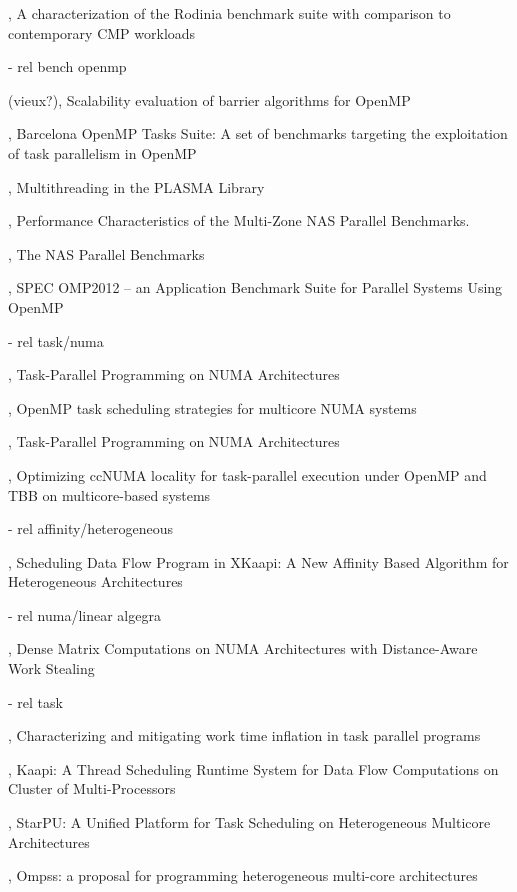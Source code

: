 \cite{Rodinia2010}, A characterization of the Rodinia benchmark suite with comparison to contemporary CMP workloads

  - rel bench openmp

(vieux?)\cite{Nanjegowda2009}, Scalability evaluation of barrier algorithms for OpenMP

\cite{Duran2009}, Barcelona OpenMP Tasks Suite: A set of benchmarks targeting the exploitation of task parallelism in OpenMP

\cite{Kurzak2013}, Multithreading in the PLASMA Library

\cite{Jin2004}, Performance Characteristics of the Multi-Zone NAS Parallel Benchmarks.

\cite{Bailey1994}, The NAS Parallel Benchmarks

\cite{Muller2012}, SPEC OMP2012 -- an Application Benchmark Suite for Parallel Systems Using OpenMP

  - rel task/numa

\cite{Wienke2012}, Task-Parallel Programming on NUMA Architectures

\cite{Olivier2012}, OpenMP task scheduling strategies for multicore NUMA systems

\cite{Terboven2012}, Task-Parallel Programming on NUMA Architectures

\cite{Wittmann2011}, Optimizing ccNUMA locality for task-parallel execution under OpenMP and TBB on multicore-based systems


  - rel affinity/heterogeneous

\cite{Bleuse2014}, Scheduling Data Flow Program in XKaapi: A New Affinity Based Algorithm for Heterogeneous Architectures

  - rel numa/linear algegra

\cite{Al-Omairy2015}, Dense Matrix Computations on NUMA Architectures with Distance-Aware Work Stealing

  - rel task

\cite{Olivier2013}, Characterizing and mitigating work time inflation in task parallel programs

\cite{Gautier2007}, Kaapi: A Thread Scheduling Runtime System for Data Flow Computations on Cluster of Multi-Processors

\cite{StarPU}, StarPU: A Unified Platform for Task Scheduling on Heterogeneous Multicore Architectures

\cite{OMPSs}, Ompss: a proposal for programming heterogeneous multi-core architectures

